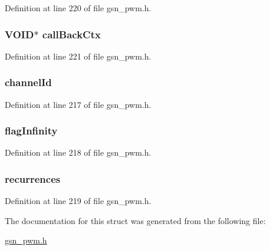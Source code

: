 Definition at line 220 of file gsn\_\-pwm.h.

\hypertarget{a00454_afb65caed518d124a037c22bd2e25ff92}{
\subsubsection[{callBackCtx}]{\setlength{\rightskip}{0pt plus 5cm}VOID$\ast$ {\bf callBackCtx}}}
\label{a00454_afb65caed518d124a037c22bd2e25ff92}


Definition at line 221 of file gsn\_\-pwm.h.

\hypertarget{a00454_a5fe6420ab870372b553e57cb7e8ac132}{
\subsubsection[{channelId}]{ {\bf channelId}}}
\label{a00454_a5fe6420ab870372b553e57cb7e8ac132}


Definition at line 217 of file gsn\_\-pwm.h.

\hypertarget{a00454_adaf75417ba21f372248f539e747cc9fa}{
\subsubsection[{flagInfinity}]{ {\bf flagInfinity}}}
\label{a00454_adaf75417ba21f372248f539e747cc9fa}


Definition at line 218 of file gsn\_\-pwm.h.

\hypertarget{a00454_acb2c805621299ebc4701d5cedd03f10c}{
\subsubsection[{recurrences}]{ {\bf recurrences}}}
\label{a00454_acb2c805621299ebc4701d5cedd03f10c}


Definition at line 219 of file gsn\_\-pwm.h.



The documentation for this struct was generated from the following file:\begin{DoxyCompactItemize}
\item 
\hyperlink{a00540}{gsn\_\-pwm.h}\end{DoxyCompactItemize}
